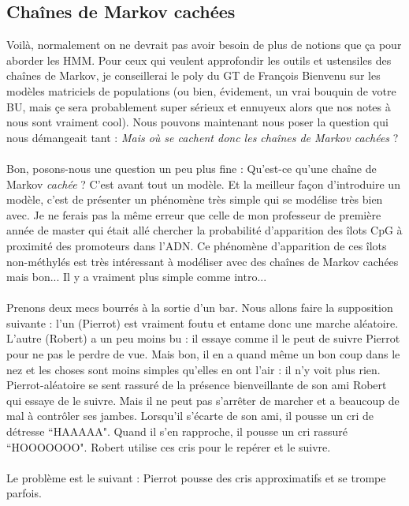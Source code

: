 \documentclass{article}
\begin{document}
\subsection{Cha\^ines de Markov cachées}

Voilà, normalement on ne devrait pas avoir besoin de plus de notions que ça pour aborder les HMM. Pour ceux qui veulent approfondir les outils et ustensiles des cha\^ines de Markov, je conseillerai le poly du GT de François Bienvenu sur les modèles matriciels de populations \cite{5} (ou bien, évidement, un vrai bouquin de votre BU, mais çe sera probablement super sérieux et ennuyeux alors que nos notes à nous sont vraiment cool). Nous pouvons maintenant nous poser la question qui nous démangeait tant : \textit{Mais où se cachent donc les chaînes de Markov cachées} ?\\
\\
Bon, posons-nous une question un peu plus fine : Qu'est-ce qu'une chaîne de Markov \textit{cachée} ? C'est avant tout un modèle. Et la meilleur façon d'introduire un modèle, c'est de présenter un phénomène très simple qui se modélise très bien avec. Je ne ferais pas la même erreur que celle de mon professeur de première année de master qui était allé chercher la probabilité d'apparition des îlots CpG à proximité des promoteurs dans l'ADN. Ce phénomène d'apparition de ces îlots non-méthylés est très intéressant à modéliser avec des chaînes de Markov cachées mais bon... Il y a vraiment plus simple comme intro...\\
\\
Prenons deux mecs bourrés à la sortie d'un bar. Nous allons faire la supposition suivante : l'un (Pierrot) est vraiment foutu et entame donc une marche aléatoire. L'autre (Robert) a un peu moins bu : il essaye comme il le peut de suivre Pierrot pour ne pas le perdre de vue. Mais bon, il en a quand même un bon coup dans le nez et les choses sont moins simples qu'elles en ont l'air : il n'y voit plus rien. Pierrot-aléatoire se sent rassuré de la présence bienveillante de son ami Robert qui essaye de le suivre. Mais il ne peut pas s'arrêter de marcher et a beaucoup de mal à contrôler ses jambes. Lorsqu'il s'écarte de son ami, il pousse un cri de détresse ``HAAAAA". Quand il s'en rapproche, il pousse un cri rassuré ``HOOOOOOO". Robert utilise ces cris pour le repérer et le suivre. \\
\\
Le problème est le suivant : Pierrot pousse des cris approximatifs et se trompe parfois. \\
\end{document}
